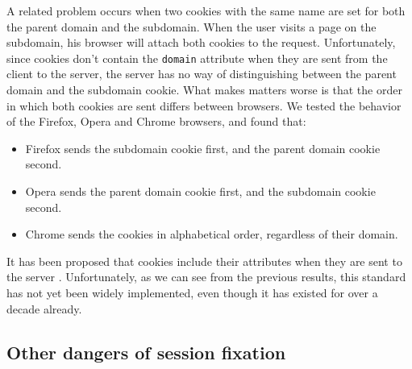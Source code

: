 A related problem occurs when two cookies with the same name are set for both the parent domain and the subdomain. When the user visits a page on the subdomain, his browser will attach both cookies to the request. Unfortunately, since cookies don't contain the \texttt{domain} attribute when they are sent from the client to the server, the server has no way of distinguishing between the parent domain and the subdomain cookie. What makes matters worse is that the order in which both cookies are sent differs between browsers. We tested the behavior of the Firefox, Opera and Chrome browsers, and found that:
\begin{itemize}
	\item Firefox sends the subdomain cookie first, and the parent domain cookie second.
	\item Opera sends the parent domain cookie first, and the subdomain cookie second.
	\item Chrome sends the cookies in alphabetical order, regardless of their domain.
\end{itemize}
It has been proposed that cookies include their attributes when they are sent to the server \cite{rfc2965}. Unfortunately, as we can see from the previous results, this standard has not yet been widely implemented, even though it has existed for over a decade already.

\subsection{Other dangers of session fixation}


